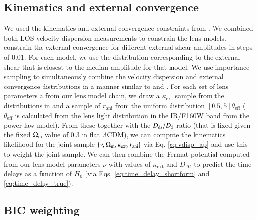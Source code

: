 \documentclass[longauth]{aa}
\newcommand{\Dd}{D_{\rm d}}
\newcommand{\Dds}{D_{\rm ds}}
\newcommand{\Ddt}{D_{\Delta t}}
\newcommand{\ajsiii}[1]{{{#1}}}
\begin{document}
\subsection{Kinematics and external convergence} \label{subsec:glee_kin_kext}
We used the kinematics and external convergence constraints from \citet{Buckley-Geer20}.  We combined both LOS velocity dispersion measurements to constrain the lens models.  \citet{Buckley-Geer20} constrain the external convergence for different external shear amplitudes in steps of 0.01.  For each model, we use the distribution corresponding to the external shear that is closest to the median amplitude for that model.  We use importance sampling \citep[e.g.][]{Lewis02} to simultaneously combine the velocity dispersion and external convergence distributions in a manner similar to \citet{Wong17} and \citet{Rusu20}. For each set of lens parameters ${\nu}$ from our lens model chain, we draw a $\kappa_{\mathrm{ext}}$ sample from the distributions in \citet{Buckley-Geer20} and a sample of $r_{\mathrm{ani}}$ from the uniform distribution \ajsiii{$[0.5,5]\theta_{\mathrm{eff}}$ ($\theta_{\mathrm{eff}}$} is calculated from the lens light distribution in the IR/F160W band from the power-law model). From these together with the $\Dds/\Dd$ ratio (that is fixed given the fixed $\Omega_{\rm m}$ value of 0.3 in flat $\Lambda$CDM), we can compute the kinematics likelihood for the joint sample $\{\nu, \Omega_{\rm m}, \kappa_{\mathrm{ext}}, r_{\mathrm{ani}}\}$ via Eq. \ref{eq:vdisp_ap} and use this to weight the joint sample.  We can then combine the Fermat potential computed from our lens model parameters $\nu$ with values of $\kappa_{\mathrm{ext}}$ and $\Ddt$ to predict the time delays as a function of $H_0$ (via Eqs. \ref{eq:time_delay_shortform} and \ref{eq:time_delay_true}).

\subsection{BIC weighting} \label{subsec:glee_bic}
\end{document}
